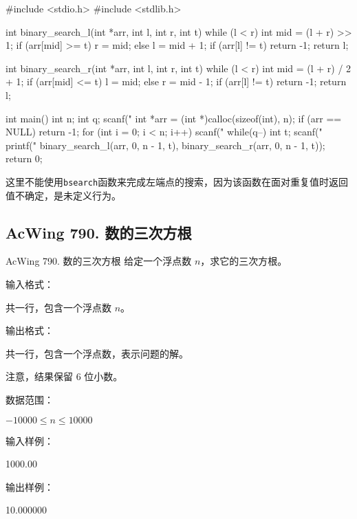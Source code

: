 \begin{mycpptwocol}
    #include <stdio.h>
    #include <stdlib.h>

    int binary_search_l(int *arr, int l, int r, int t)
    {
        while (l < r) {
            int mid = (l + r) >> 1;
            if (arr[mid] >= t) {
                r = mid;
            } else {
                l = mid + 1;
            }
        }
        if (arr[l] != t) {
            return -1;
        }
        return l;
    }

    int binary_search_r(int *arr, int l, int r, int t)
    {
        while (l < r) {
            int mid = (l + r) / 2 + 1;
            if (arr[mid] <= t) {
                l = mid;
            } else {
                r = mid - 1;
            }
        }
        if (arr[l] != t) {
            return -1;
        }
        return l;
    }

    int main()
    {
        int n;
        int q;
        scanf("%
        int *arr = (int *)calloc(sizeof(int), n);
        if (arr == NULL) {
            return -1;
        }
        for (int i = 0; i < n; i++) {
            scanf("%
        }
        while(q--) {
            int t;
            scanf("%
            printf("%
            binary_search_l(arr, 0, n - 1, t),
            binary_search_r(arr, 0, n - 1, t));
        }
        return 0;
    }
\end{mycpptwocol}

\begin{exclamation}
    这里不能使用\lstinline{bsearch}函数来完成左端点的搜索，因为该函数在面对重复值时返回值不确定，是未定义行为。
\end{exclamation}

\subsection{AcWing 790. 数的三次方根}
\begin{titledbox}{AcWing 790. 数的三次方根}
    给定一个浮点数 $n$，求它的三次方根。

    输入格式：

    共一行，包含一个浮点数 $n$。

    输出格式：

    共一行，包含一个浮点数，表示问题的解。
    
    注意，结果保留 $6$ 位小数。
    
    数据范围：

    $-10000 \le n \le 10000$
    
    输入样例：
    
    1000.00
    
    输出样例：

    10.000000
\end{titledbox}

